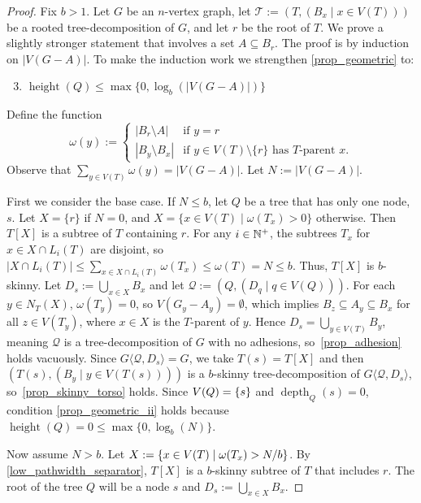 \documentclass{patmorin}
\renewcommand{\le}{\leqslant}
\newcommand{\torso}[2]{{#1}\langle{#2}\rangle}
\DeclareMathOperator{\height}{height}
\DeclareMathOperator{\depth}{depth}
\DeclarePairedDelimiter{\set}{\{}{\}}
\newcommand{\calQ}{\mathcal{Q}}
\newcommand{\calT}{\mathcal{T}}
\begin{document}
\begin{proof}
  Fix $b>1$.    Let $G$ be an $n$-vertex graph, let $\calT:=(T,(B_x\mid x\in V(T)))$ be a rooted tree-decomposition of $G$, and let $r$ be the root of $T$.  We prove a slightly stronger statement that involves a set $A\subseteq B_r$.  The proof is by induction on $|V(G-A)|$.   To make the induction work we strengthen \ref{prop_geometric} to:
  \begin{enumerate}[nosep,nolistsep,label=\rm(\alph*')]
    \setcounter{enumi}{2}
    \item\label{prop_geometric_ii} $\height(Q) \le \max\{0, \log_b(|V(G-A)|)\}$
  \end{enumerate}

  Define the function
  \[
    \omega(y) := \begin{cases}
      |B_r\setminus A|   & \text{if $y=r$}                                         \\
      |B_y\setminus B_x| & \text{if $y\in V(T)\setminus\{r\}$ has $T$-parent $x$.}
    \end{cases}
  \]
  Observe that $\sum_{y\in V(T)}\omega(y)=|V(G-A)|$. Let $N:=|V(G-A)|$.

  First we consider the base case. If $N\le b$, let $Q$ be a tree that has only one node, $s$. Let $X=\{r\}$ if $N=0$, and $X=\{x\in V(T)\mid \omega(T_x)>0\}$ otherwise. Then $T[X]$ is a subtree of $T$ containing $r$. For any $i\in\mathbb{N}^+$, the subtrees $T_x$ for $x\in X\cap L_i(T)$ are disjoint, so $|X\cap L_i(T)| \le \sum_{x\in X\cap L_i(T)}\omega(T_x) \le \omega(T) = N \le b$. Thus, $T[X]$ is $b$-skinny. Let $D_s:=\bigcup_{x\in X} B_x$ and let $\calQ:=(Q,(D_q\mid q\in V(Q)))$. For each $y\in N_T(X)$, $\omega(T_y)=0$, so $V(G_y-A_y)=\emptyset$, which implies $B_z\subseteq A_y\subseteq B_x$ for all $z\in V(T_y)$, where $x\in X$ is the $T$-parent of $y$. Hence $D_s=\bigcup_{y\in V(T)} B_y$, meaning $\calQ$ is a tree-decomposition of $G$ with no adhesions, so~\ref{prop_adhesion} holds vacuously. Since $\torso{G}{\calQ,D_s}=G$, we take $T(s)=T[X]$ and then $(T(s),(B_y\mid y\in V(T(s))))$ is a $b$-skinny tree-decomposition of $\torso{G}{\calQ,D_s}$, so~\ref{prop_skinny_torso} holds. Since $V(Q)=\set{s}$ and $\depth_Q(s)=0$, condition \ref{prop_geometric_ii} holds because $\height(Q)=0 \le \max\{0, \log_b(N)\}$.

  Now assume $N> b$. Let $X:=\set{x\in V(T)\mid  \omega(T_x)>N/b}$. By \cref{low_pathwidth_separator}, $T[X]$ is a $b$-skinny subtree of $T$ that includes $r$.  The root of the tree $Q$ will be a node $s$ and $D_s:=\bigcup_{x\in X} B_x$.


\end{proof}
\end{document}
